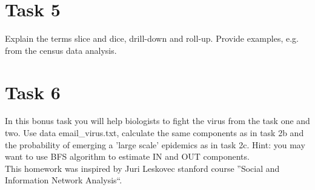 \documentclass{article}
\begin{document}
\section*{Task 5}
Explain the terms slice and dice, drill-down and roll-up. Provide examples, e.g. from the census data analysis.

\section*{Task 6}
In this bonus task you will help biologists to fight the virus from the task one and two. Use data email\_virus.txt, calculate the same components as in task 2b and the probability of emerging a 'large scale' epidemics as in task 2c. Hint: you may want to use BFS algorithm to estimate IN and OUT components.
\medskip
\\
This homework was inspired by Juri Leskovec stanford course ''Social and Information Network Analysis``. 
\end{document}
